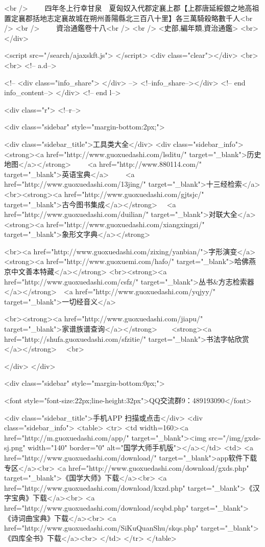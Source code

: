 <br />
　　四年冬上行幸甘泉　夏匈奴入代郡定襄上郡【上郡唐延綏銀之地高祖置定襄郡括地志定襄故城在朔州善陽縣北三百八十里】各三萬騎殺略數千人<br />
<br />
　　資治通鑑卷十八<br />
<br />
<史部,編年類,資治通鑑>  <br>
   </div> 

<script src="/search/ajaxskft.js"> </script>
 <div class="clear"></div>
<br>
<br>
 <!-- a.d-->

 <!--
<div class="info_share">
</div> 
-->
 <!--info_share--></div>   <!-- end info_content-->
  </div> <!-- end l-->

<div class="r">   <!--r-->



<div class="sidebar"  style="margin-bottom:2px;">

 
<div class="sidebar_title">工具类大全</div>
<div class="sidebar_info">
<strong><a href="http://www.guoxuedashi.com/lsditu/" target="_blank">历史地图</a></strong>　　
<a href="http://www.880114.com/" target="_blank">英语宝典</a>　　
<a href="http://www.guoxuedashi.com/13jing/" target="_blank">十三经检索</a>　
<br><strong><a href="http://www.guoxuedashi.com/gjtsjc/" target="_blank">古今图书集成</a></strong>　
<a href="http://www.guoxuedashi.com/duilian/" target="_blank">对联大全</a>　<strong><a href="http://www.guoxuedashi.com/xiangxingzi/" target="_blank">象形文字典</a></strong>　

<br><a href="http://www.guoxuedashi.com/zixing/yanbian/">字形演变</a>　　<strong><a href="http://www.guoxuemi.com/hafo/" target="_blank">哈佛燕京中文善本特藏</a></strong>
<br><strong><a href="http://www.guoxuedashi.com/csfz/" target="_blank">丛书&方志检索器</a></strong>　<a href="http://www.guoxuedashi.com/yqjyy/" target="_blank">一切经音义</a>　　

<br><strong><a href="http://www.guoxuedashi.com/jiapu/" target="_blank">家谱族谱查询</a></strong>　　<strong><a href="http://shufa.guoxuedashi.com/sfzitie/" target="_blank">书法字帖欣赏</a></strong>　
<br>

</div>
</div>


<div class="sidebar" style="margin-bottom:0px;">

<font style="font-size:22px;line-height:32px">QQ交流群9：489193090</font>


<div class="sidebar_title">手机APP 扫描或点击</div>
<div class="sidebar_info">
<table>
<tr>
	<td width=160><a href="http://m.guoxuedashi.com/app/" target="_blank"><img src="/img/gxds-sj.png" width="140"  border="0" alt="国学大师手机版"></a></td>
	<td>
<a href="http://www.guoxuedashi.com/download/" target="_blank">app软件下载专区</a><br>
<a href="http://www.guoxuedashi.com/download/gxds.php" target="_blank">《国学大师》下载</a><br>
<a href="http://www.guoxuedashi.com/download/kxzd.php" target="_blank">《汉字宝典》下载</a><br>
<a href="http://www.guoxuedashi.com/download/scqbd.php" target="_blank">《诗词曲宝典》下载</a><br>
<a href="http://www.guoxuedashi.com/SiKuQuanShu/skqs.php" target="_blank">《四库全书》下载</a><br>
</td>
</tr>
</table>

